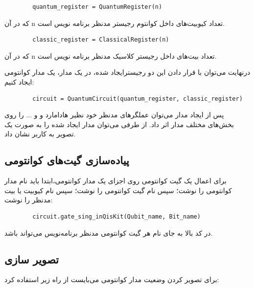 \documentclass{book}
\begin{document}
\begin{latin}
	\begin{verbatim}
		quantum_register = QuantumRegister(n)
	\end{verbatim}
\end{latin}
که در آن n تعداد کیوبیت‌های داخل کوانتوم رجیستر مدنظر برنامه نویس است.


\begin{latin}
	\begin{verbatim}
		classic_register = ClassicalRegister(n)
	\end{verbatim}
\end{latin}
که در آن n تعداد بیت‌های داخل رجیستر کلاسیک مدنظر برنامه نویس است.


درنهایت ‌می‌توان با قرار دادن این دو رجیستر‌ایجاد شده،‌ در یک مدار، یک مدار کوانتومی ایجاد کنیم:


\begin{latin}
	\begin{verbatim}
		circuit = QuantumCircuit(quantum_register, classic_register)
	\end{verbatim}
\end{latin}


پس از ایجاد مدار می‌توان عملگر‌های مدنظر خود نظیر هادامارد و  و ... را روی بخش‌های مختلف مدار اثر داد.
از طرفی می‌توان مدار ایجاد شده را به صورت یک تصویر به کاربر نشان داد.


\subsection{پیاده‌سازی گیت‌های کوانتومی}
برای اعمال یک گیت کوانتومی روی اجزای یک مدار کوانتومی،‌ابتدا باید نام مدار کوانتومی را نوشت؛ سپس نام گیت کوانتومی را نوشت؛ سپس نام کیوبیت یا بیت مدنظر را نوشت: 

\begin{latin}
	\begin{verbatim}
		circuit.gate_sing_inQisKit(Qubit_name, Bit_name)
	\end{verbatim}
\end{latin}


در کد بالا به جای  نام هر گیت کوانتومی مدنظر برنامه‌نویس می‌تواند باشد.

\pagebreak
\subsection{تصویر سازی}

برای تصویر کردن وضعیت مدار کوانتومی می‌بایست از راه زیر استفاده کرد:
\end{document}
